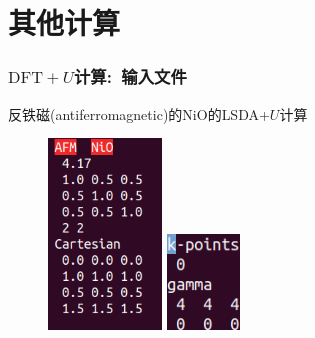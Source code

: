 \section{其他计算}
\frame
{
	\frametitle{$\mathrm{DFT}+U$计算:~输入文件}
反铁磁(\textrm{antiferromagnetic})的\textrm{NiO}的\textrm{LSDA+$U$}计算%
\begin{figure}[h!]
\centering
\includegraphics[height=2.0in,viewport=0 5 210 260,clip]{Figures/NiO-LDA_U-POSCAR.png}
\includegraphics[height=1.0in,viewport=0 0 100 110,clip]{Figures/NiO-LDA_U-KPOINTS.png}
\caption{\fontsize{6.2pt}{5.2pt}}%
\label{NiO-LDA_U-Input}
\end{figure}
}

